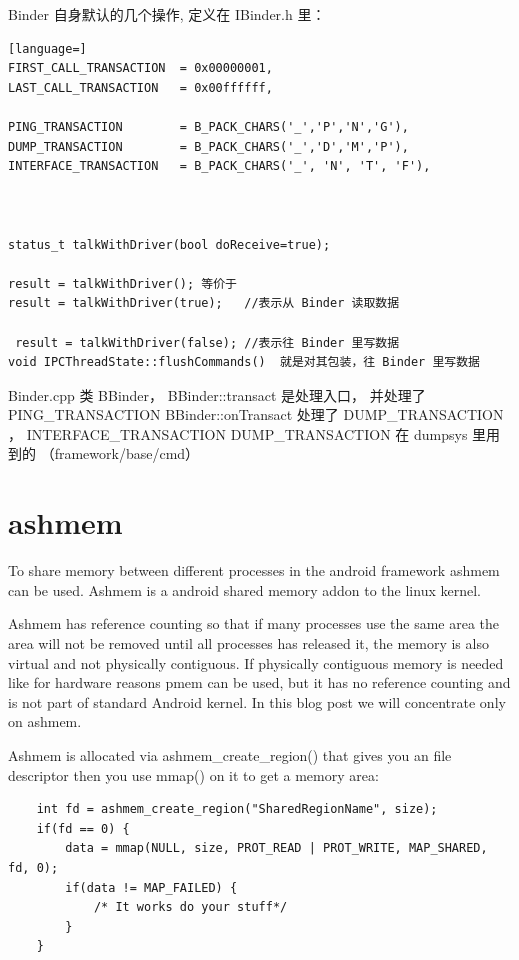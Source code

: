 \documentclass[a4paper,11pt]{article}
\begin{document}
Binder 自身默认的几个操作, 定义在 IBinder.h 里：
\begin{lstlisting}[language=]
FIRST_CALL_TRANSACTION  = 0x00000001,
LAST_CALL_TRANSACTION   = 0x00ffffff,

PING_TRANSACTION        = B_PACK_CHARS('_','P','N','G'),
DUMP_TRANSACTION        = B_PACK_CHARS('_','D','M','P'),
INTERFACE_TRANSACTION   = B_PACK_CHARS('_', 'N', 'T', 'F'),



status_t talkWithDriver(bool doReceive=true);

result = talkWithDriver(); 等价于
result = talkWithDriver(true);   //表示从 Binder 读取数据

 result = talkWithDriver(false); //表示往 Binder 里写数据
void IPCThreadState::flushCommands()  就是对其包装，往 Binder 里写数据
\end{lstlisting}

Binder.cpp  类 BBinder，
BBinder::transact 是处理入口， 并处理了  PING_TRANSACTION 
BBinder::onTransact 处理了 DUMP_TRANSACTION ， INTERFACE_TRANSACTION 
DUMP_TRANSACTION 在 dumpsys 里用到的 （framework/base/cmd）



\section{ashmem}
To share memory between different processes in the android framework ashmem
can be used. Ashmem is a android shared memory addon to the linux kernel. 

Ashmem has reference counting so that if many processes use the same area the
area will not be removed until all processes has released it, the memory is
also virtual and not physically contiguous. If physically contiguous memory is
needed like for hardware reasons pmem can be used, but it has no reference
counting and is not part of standard Android kernel. 
In this blog post we will concentrate only on ashmem.

Ashmem is allocated via ashmem_create_region() that gives you an file
descriptor then you use mmap() on it to get a memory area:
\begin{lstlisting}
    int fd = ashmem_create_region("SharedRegionName", size);
    if(fd == 0) {
        data = mmap(NULL, size, PROT_READ | PROT_WRITE, MAP_SHARED, fd, 0);
        if(data != MAP_FAILED) {
            /* It works do your stuff*/
        }
    }
\end{lstlisting}
\end{document}

